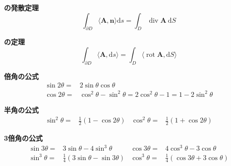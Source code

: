\documentclass[12pt,b5paper]{ltjsarticle}
\newcommand{\Rot}{\mathop{\mathrm{rot}}\nolimits}
\newcommand{\Div}{\mathop{\mathrm{div}}\nolimits}
\begin{document}
\textbf{の発散定理}
\begin{equation}
 \int_{\partial D} \langle \bm{A}, \bm{n} \rangle \mathrm{d}s
  =\int_{D} \Div\bm{A} \ \mathrm{d}S
\end{equation}

\textbf{の定理}
\begin{equation}
 \int_{\partial D} \langle \bm{A}, \mathrm{d}s \rangle
  =\int_{D} \langle \Rot\bm{A}, \mathrm{d}S \rangle
\end{equation}


\dotfill

\textbf{倍角の公式}
\begin{align}
 \sin2\theta =& 2\sin\theta \cos\theta\\
 \cos2\theta =& \cos^2\theta - \sin^2\theta
 = 2\cos^2\theta - 1
 = 1 - 2\sin^2\theta
\end{align}

\textbf{半角の公式}
\begin{align}
 \sin^2\theta =& \frac{1}{2}(1-\cos2\theta) & \cos^2\theta =& \frac{1}{2}(1+\cos2\theta)
\end{align}

\textbf{3倍角の公式}
\begin{align}
 \sin 3\theta =& 3\sin\theta - 4\sin^3\theta &
 \cos 3\theta =& 4\cos^3\theta - 3\cos\theta\\
 \sin^3\theta =& \frac{1}{4}(3\sin\theta - \sin 3\theta) &
 \cos^3\theta =& \frac{1}{4}(\cos 3\theta + 3\cos\theta)
\end{align}


\hrulefill
\end{document}
